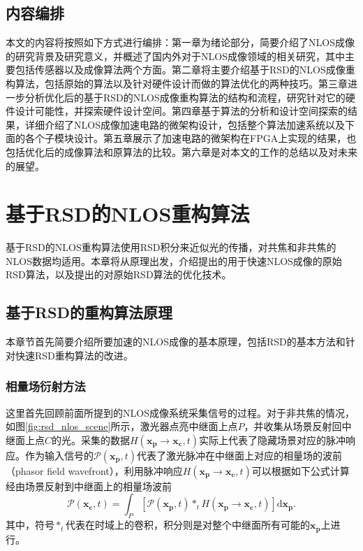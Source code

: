 \documentclass[master]{shtthesis}             %
\begin{document}
\section{内容编排}

本文的内容将按照如下方式进行编排：第一章为绪论部分，简要介绍了NLOS成像的研究背景及研究意义，并概述了国内外对于NLOS成像领域的相关研究，其中主要包括传感器以及成像算法两个方面。第二章将主要介绍基于RSD的NLOS成像重构算法，包括原始的算法以及针对硬件设计而做的算法优化的两种技巧。第三章进一步分析优化后的基于RSD的NLOS成像重构算法的结构和流程，研究针对它的硬件设计可能性，并探索硬件设计空间。第四章基于算法的分析和设计空间探索的结果，详细介绍了NLOS成像加速电路的微架构设计，包括整个算法加速系统以及下面的各个子模块设计。第五章展示了加速电路的微架构在FPGA上实现的结果，也包括优化后的成像算法和原算法的比较。第六章是对本文的工作的总结以及对未来的展望。

\chapter{基于RSD的NLOS重构算法}
 
基于RSD的NLOS重构算法使用RSD积分来近似光的传播，对共焦和非共焦的NLOS数据均适用\citep{Elten2019}。本章将从原理出发，介绍\citet{Liu}提出的用于快速NLOS成像的原始RSD算法，以及\citet{jiang2021ring}提出的对原始RSD算法的优化技术。

\section{基于RSD的重构算法原理}\label{sec:rsd_recons_pp}

本章节首先简要介绍所要加速的NLOS成像的基本原理，包括RSD的基本方法和针对快速RSD重构算法的改进。

\subsection{相量场衍射方法}\label{sec:phasor_field_diff}

这里首先回顾前面所提到的NLOS成像系统采集信号的过程。对于非共焦的情况，如图\ref{fig:rsd_nlos_scene}所示，激光器点亮中继面上点$P$，并收集从场景反射回中继面上点$C$的光。采集的数据$H(\mathbf{x_p}\rightarrow \mathbf{x_c},t)$实际上代表了隐藏场景对应的脉冲响应。作为输入信号的$\mathcal{P}(\mathbf{x_p},t)$代表了激光脉冲在中继面上对应的相量场的波前（phasor field wavefront），利用脉冲响应$H(\mathbf{x_p}\rightarrow \mathbf{x_c},t)$可以根据如下公式计算经由场景反射到中继面上的相量场波前
\begin{equation}\label{eq:convt}
  \mathcal{P}(\mathbf{x_c},t) = \int_P \left[ \mathcal{P}(\mathbf{x_p},t) *_t H(\mathbf{x_p}\rightarrow \mathbf{x_c},t) \right] \text{d}\mathbf{x_p}.
\end{equation}
其中，符号$*_t$代表在时域上的卷积，积分则是对整个中继面所有可能的$\mathbf{x_p}$上进行。
\end{document}
